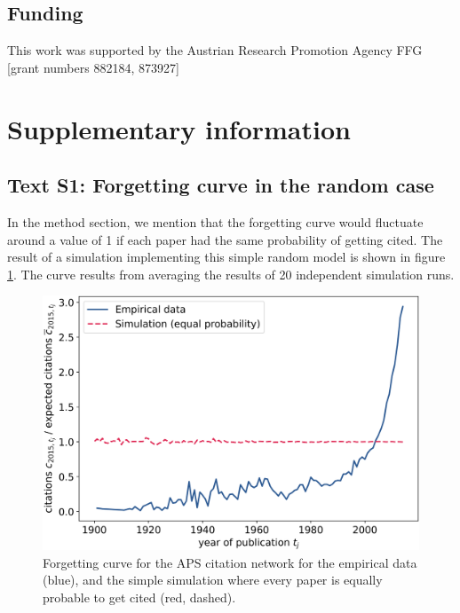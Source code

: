 \documentclass[fleqn,10pt]{wlscirep}
\begin{document}
\subsection*{Funding}
This work was supported by the Austrian Research Promotion Agency FFG [grant numbers 882184, 873927]\\










\newpage

\section*{Supplementary information}
\setcounter{page}{1}

\subsection*{Text S1: Forgetting curve in the random case}
\label{SI1}

In the method section, we mention that the forgetting curve would fluctuate around a value of 1 if each paper had the same probability of getting cited. The result of a simulation implementing this simple random model is shown in figure \ref{fig:si1}. The curve results from averaging the results of 20 independent simulation runs.


\begin{figure}[h!]
	\centering
	 \includegraphics[width=0.7\columnwidth]{SI1.png}
	\caption{Forgetting curve for the APS citation network for the empirical data (blue), and the simple simulation where every paper is equally probable to get cited (red, dashed).
	}
	\label{fig:si1}
\end{figure}
\end{document}

